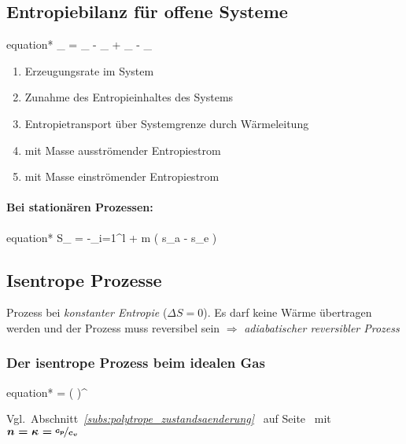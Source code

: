 	\subsection{Entropiebilanz für offene Systeme} %
		\begin{empheq}[box=\shadowbox]{equation*}
			_{}
			=
			_{}
			-
			_{}
			+
			_{}
			-
			_{}
		\end{empheq}
		\begin{enumerate}
			\item Erzeugungsrate im System
			\item Zunahme des Entropieinhaltes des Systems
			\item Entropietransport über Systemgrenze durch Wär\-me\-lei\-tung
			\item mit Masse ausströmender Entropiestrom
			\item mit Masse einströmender Entropiestrom
		\end{enumerate}
		
		\paragraph{Bei stationären Prozessen:} %
			\begin{empheq}[box=\shadowbox]{equation*}
				\dot S_{}
				=
				-\sum_{i=1}^l 
				+
				\dot m \cdot (
					s_a - s_e
				)
			\end{empheq}
	
	\subsection{Isentrope Prozesse} %
		Prozess bei \emph{konstanter Entropie} ($\Delta S = 0$). Es darf keine Wärme übertragen werden und der Prozess muss reversibel sein $\Rightarrow$ \emph{adiabatischer reversibler Prozess}
		
		\subsubsection{Der isentrope Prozess beim idealen Gas} %
			\begin{empheq}[box=\shadowbox]{equation*}
				 = \left(
				\right)^{\kappa}
			\end{empheq}
			Vgl.~Abschnitt~\emph{\ref{subs:polytrope_zustandsaenderung}~} auf Seite~\pageref{subs:polytrope_zustandsaenderung} mit $\boldsymbol{n = \kappa = }\nicefrac{\boldsymbol{c_p}}{\boldsymbol{c_v}}$
		

